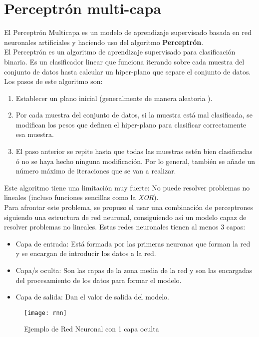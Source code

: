 \section{Perceptrón multi-capa}
\label{alg:mlp}
El Perceptrón Multicapa es un modelo de aprendizaje supervisado basada en red neuronales artificiales y haciendo uso del algoritmo \textbf{Perceptrón}.\\
\linebreak
El Perceptrón es un algoritmo de aprendizaje supervisado para clasificación binaria. Es un clasificador linear que funciona iterando sobre cada muestra del conjunto de datos hasta calcular un hiper-plano que separe el conjunto de datos. Los pasos de este algoritmo son:
\begin{enumerate}
	\item Establecer un plano inicial (generalmente de manera aleatoria ).
	\item Por cada muestra del conjunto de datos, si la muestra está mal clasificada, se modifican los pesos que definen el hiper-plano para clasificar correctamente esa muestra.
	\item El paso anterior se repite hasta que todas las muestras estén bien clasificadas ó no se haya hecho ninguna modificación. Por lo general, también se añade un número máximo de iteraciones que se van a realizar.
\end{enumerate}
Este algoritmo tiene una limitación muy fuerte: No puede resolver problemas no lineales (incluso funciones sencillas como la \textit{XOR}). \\
\linebreak
Para afrontar este problema, se propuso el usar una combinación de perceptrones siguiendo una estructura de red neuronal, consiguiendo así un modelo capaz de resolver problemas no lineales. Estas redes neuronales tienen al menos 3 capas:
\begin{itemize}
	\item Capa de entrada: Está formada por las primeras neuronas que forman la red y se encargan de introducir los datos a la red.
	\item Capa/s oculta: Son las capas de la zona media de la red y son las encargadas del procesamiento de los datos para formar el modelo.
	\item Capa de salida: Dan el valor de salida del modelo.
\end{itemize}
\begin{figure}[H]
	\centering
	\texttt{[image: rnn]}
	\caption{Ejemplo de Red Neuronal con 1 capa oculta}
	\label{fig:rnn}
\end{figure}
